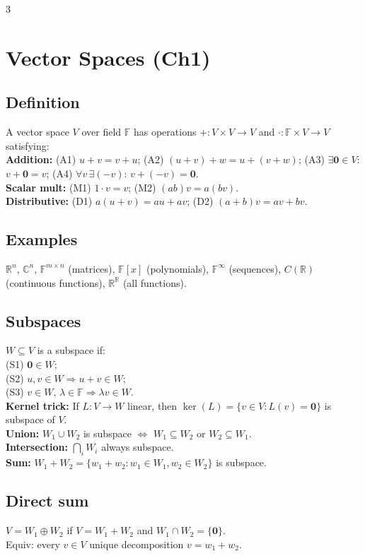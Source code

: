 \documentclass[10pt]{article}
\newcommand{\R}{\mathbb{R}}
\newcommand{\C}{\mathbb{C}}
\newcommand{\F}{\mathbb{F}}
\newcommand{\Ker}{\operatorname{ker}}
\begin{document}
\begin{multicols}{3}
\footnotesize
\raggedcolumns

\section*{Vector Spaces (Ch1)}

\subsection*{Definition}
A vector space $V$ over field $\F$ has operations $+:V\times V\to V$ and $\cdot:\F\times V\to V$ satisfying:\\
\textbf{Addition:} (A1) $u+v=v+u$; (A2) $(u+v)+w=u+(v+w)$; (A3) $\exists\bm{0}\in V$: $v+\bm{0}=v$; (A4) $\forall v\,\exists(-v)$: $v+(-v)=\bm{0}$.\\
\textbf{Scalar mult:} (M1) $1\cdot v=v$; (M2) $(ab)v=a(bv)$.\\
\textbf{Distributive:} (D1) $a(u+v)=au+av$; (D2) $(a+b)v=av+bv$.

\subsection*{Examples}
$\R^n$, $\C^n$, $\F^{m\times n}$ (matrices), $\F[x]$ (polynomials), $\F^\infty$ (sequences), $C(\R)$ (continuous functions), $\R^\R$ (all functions).

\subsection*{Subspaces}
$W\subseteq V$ is a subspace if:\\
(S1) $\bm{0}\in W$;\\
(S2) $u,v\in W\Rightarrow u+v\in W$;\\
(S3) $v\in W,\,\lambda\in\F\Rightarrow\lambda v\in W$.\\
\textbf{Kernel trick:} If $L:V\to W$ linear, then $\Ker(L)=\{v\in V:L(v)=\bm{0}\}$ is subspace of $V$.\\
\textbf{Union:} $W_1\cup W_2$ is subspace $\Leftrightarrow$ $W_1\subseteq W_2$ or $W_2\subseteq W_1$.\\
\textbf{Intersection:} $\bigcap_i W_i$ always subspace.\\
\textbf{Sum:} $W_1+W_2=\{w_1+w_2:w_1\in W_1,w_2\in W_2\}$ is subspace.

\subsection*{Direct sum}
$V=W_1\oplus W_2$ if $V=W_1+W_2$ and $W_1\cap W_2=\{\bm{0}\}$.\\
Equiv: every $v\in V$ unique decomposition $v=w_1+w_2$.


\end{multicols}
\end{document}
